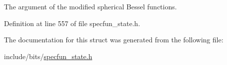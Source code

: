 The argument of the modified spherical Bessel functions. 



Definition at line 557 of file specfun\+\_\+state.\+h.



The documentation for this struct was generated from the following file\+:\begin{DoxyCompactItemize}
\item 
include/bits/\hyperlink{specfun__state_8h}{specfun\+\_\+state.\+h}\end{DoxyCompactItemize}
